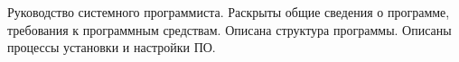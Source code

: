 Руководство системного программиста. Раскрыты общие сведения о программе, требования к программным средствам.
Описана структура программы. Описаны процессы установки и настройки ПО.
